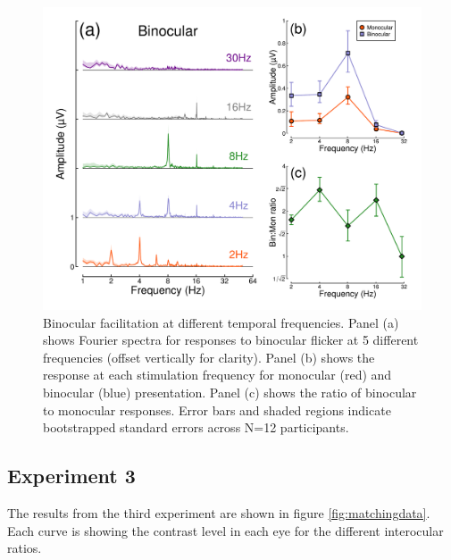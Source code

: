 \documentclass[
]{article}
\begin{document}
\begin{figure}

{\centering \includegraphics{Figures/TFdata} 

}

\caption{Binocular facilitation at different temporal frequencies. Panel (a) shows Fourier spectra for responses to binocular flicker at 5 different frequencies (offset vertically for clarity). Panel (b) shows the response at each stimulation frequency for monocular (red) and binocular (blue) presentation. Panel (c) shows the ratio of binocular to monocular responses. Error bars and shaded regions indicate bootstrapped standard errors across N=12 participants.}\label{fig:TFdata}
\end{figure}

\hypertarget{experiment-3-1}{%
\subsection{Experiment 3}\label{experiment-3-1}}

The results from the third experiment are shown in figure \ref{fig:matchingdata}. Each curve is showing the contrast level in each eye for the different interocular ratios.
\end{document}
